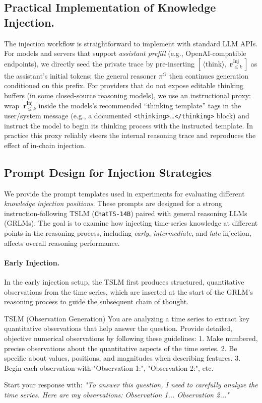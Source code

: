 \documentclass[twoside]{article}
\begin{document}
\subsection{Practical Implementation of Knowledge Injection.}
The injection workflow is straightforward to implement with standard LLM APIs. For models and servers that support \emph{assistant prefill} (e.g., OpenAI-compatible endpoints), we directly seed the private trace by pre-inserting
\(
[\,\langle\mathrm{think}\rangle,\;\mathbf{r}^{\text{Inj}}_{\le k}\,]
\)
as the assistant’s initial tokens; the general reasoner \(\pi^{G}\) then continues generation conditioned on this prefix. For providers that do not expose editable thinking buffers (in some closed-source reasoning models), we use an {instructional proxy}: wrap \(\ \mathbf{r}^{\text{Inj}}_{\le k}\) inside the models’s recommended “thinking template” tags in the user/system message (e.g., a documented \texttt{<thinking>}…\texttt{</thinking>} block) and instruct the model to begin its thinking process with the instructed template. In practice this proxy reliably steers the internal reasoning trace and reproduces the effect of in-chain injection. 

\subsection{Prompt Design for Injection Strategies}

We provide the prompt templates used in experiments for evaluating different \emph{knowledge injection positions}. These prompts are designed for a strong instruction-following TSLM (\texttt{ChatTS-14B}) paired with general reasoning LLMs (GRLMs). The goal is to examine how injecting time-series knowledge at different points in the reasoning process, including \emph{early}, \emph{intermediate}, and \emph{late} injection, affects overall reasoning performance.

\paragraph{Early Injection.}
In the early injection setup, the TSLM first produces structured, quantitative observations from the time series, which are inserted at the start of the GRLM’s reasoning process to guide the subsequent chain of thought.

\begin{promptbox}{TSLM (Observation Generation)}
You are analyzing a time series to extract key quantitative observations that help answer the question.  
Provide detailed, objective numerical observations by following these guidelines:  
1. Make numbered, precise observations about the quantitative aspects of the time series.  
2. Be specific about values, positions, and magnitudes when describing features.  
3. Begin each observation with "Observation 1:", "Observation 2:", etc.  

Start your response with:  
\textit{"To answer this question, I need to carefully analyze the time series. Here are my observations: Observation 1... Observation 2..."}  
\end{promptbox}
\end{document}
